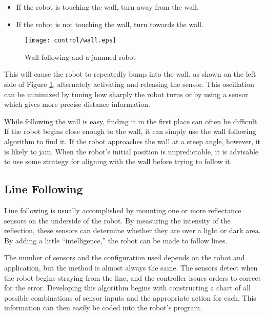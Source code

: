 \begin{itemize}

\item If the robot is touching the wall, turn away from the wall.
\item If the robot is not touching the wall, turn towards the wall.

\end{itemize}

\begin{figure}[htbp]
\begin{center}
\texttt{[image: control/wall.eps]}
 \caption{Wall following and a jammed robot}
 \label{wall}
\end{center}
\end{figure}

This will cause the robot to repeatedly bump into the wall, as shown
on the left side of Figure \ref{wall}, alternately activating and
releasing the sensor.  This oscillation can be minimized by tuning how
sharply the robot turns or by using a sensor which gives more precise
distance information.

While following the wall is easy, finding it in the first place can
often be difficult.  If the robot begins close enough to the wall, it
can simply use the wall following algorithm to find it.  If the robot
approaches the wall at a steep angle, however, it is likely to
jam. When the robot's initial position is unpredictable, it is
advisable to use some strategy for aligning with the wall before
trying to follow it.

\subsection{Line Following}

Line following is usually accomplished by mounting one or more
reflectance sensors on the underside of the robot.  By measuring the
intensity of the reflection, these sensors can determine whether they
are over a light or dark area.  By adding a little ``intelligence,''
the robot can be made to follow lines.

The number of sensors and the configuration used depends on the robot
and application, but the method is almost always the same.  The
sensors detect when the robot begins straying from the line, and the
controller issues orders to correct for the error.  Developing this
algorithm begins with constructing a chart of all possible
combinations of sensor inputs and the appropriate action for each.
This information can then easily be coded into the robot's program.

